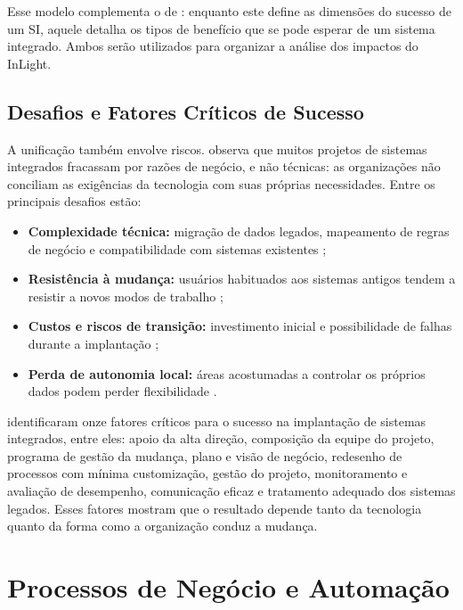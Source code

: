 Esse modelo complementa o de \citet{delone2003}: enquanto este define as dimensões do sucesso de um SI, aquele detalha os tipos de benefício que se pode esperar de um sistema integrado. Ambos serão utilizados para organizar a análise dos impactos do InLight.

\subsection{Desafios e Fatores Críticos de Sucesso}

A unificação também envolve riscos. \citet{davenport1998} observa que muitos projetos de sistemas integrados fracassam por razões de negócio, e não técnicas: as organizações não conciliam as exigências da tecnologia com suas próprias necessidades. Entre os principais desafios estão:

\begin{itemize}
    \item \textbf{Complexidade técnica:} migração de dados legados, mapeamento de regras de negócio e compatibilidade com sistemas existentes \citep{bisbal1999};
    \item \textbf{Resistência à mudança:} usuários habituados aos sistemas antigos tendem a resistir a novos modos de trabalho \citep{kotter1996};
    \item \textbf{Custos e riscos de transição:} investimento inicial e possibilidade de falhas durante a implantação \citep{laudon2020};
    \item \textbf{Perda de autonomia local:} áreas acostumadas a controlar os próprios dados podem perder flexibilidade \citep{goodhue1992}.
\end{itemize}

\citet{nah2001} identificaram onze fatores críticos para o sucesso na implantação de sistemas integrados, entre eles: apoio da alta direção, composição da equipe do projeto, programa de gestão da mudança, plano e visão de negócio, redesenho de processos com mínima customização, gestão do projeto, monitoramento e avaliação de desempenho, comunicação eficaz e tratamento adequado dos sistemas legados. Esses fatores mostram que o resultado depende tanto da tecnologia quanto da forma como a organização conduz a mudança.

\section{Processos de Negócio e Automação}
\label{sec:processos}

